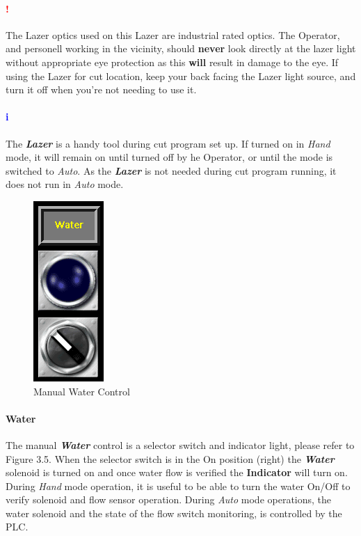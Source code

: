 \paragraph*{\textbf{{\LARGE \textcolor{red}{!}}}} The Lazer optics used on this Lazer are industrial rated optics. The Operator, and personell working in the vicinity, should \textbf{never} look directly at the lazer light without appropriate eye protection as this \textbf{will} result in damage to the eye. If using the Lazer for cut location, keep your back facing the Lazer light source, and turn it off when you're not needing to use it.
\paragraph*{\textbf{\LARGE \textcolor{blue}{i}}} The \textbf{\textit{Lazer}} is a handy tool during cut program set up. If turned on in \textit{Hand} mode, it will remain on until turned off by he Operator, or until the mode is switched to \textit{Auto}. As the \textbf{\textit{Lazer}} is not needed during cut program running, it does not run in \textit{Auto} mode.
\pagebreak
\nopagebreak
\begin{figure}
	\centering
	\includegraphics[width=.2\linewidth]{screen-captures/manual-water}
	\caption{Manual Water Control}
	\label{fig:manual-water}
\end{figure}
\paragraph*{Water}The manual \textbf{\textit{Water}} control is a selector switch and indicator light, please refer to Figure 3.5. When the selector switch is in the On position (right) the \textbf{\textit{Water}} solenoid is turned on and once water flow is verified the \textbf{Indicator} will turn on. During \textit{Hand} mode operation, it is useful to be able to turn the water On/Off to verify solenoid and flow sensor operation. During \textit{Auto} mode operations, the water solenoid and the state of the flow switch monitoring, is controlled by the PLC.
